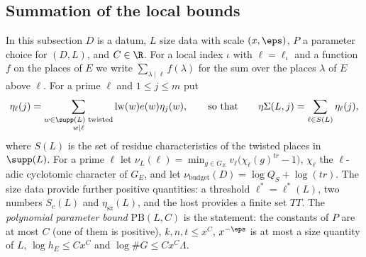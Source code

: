 \subsection{Summation of the local bounds}\label{sec:pf:linkN:sum}

In this subsection $D$ is a datum, $L$ size data with scale $(x,\eps)$, $P$ a parameter choice for $(D,L)$, and $C\in\R$.
For a local index $\iota$ with $\ell=\ell_\iota$ and a function $f$ on the places of $E$ we write $\sum_{\lambda\mid\ell}f(\lambda)$
for the sum over the places $\lambda$ of $E$ above $\ell$. For a prime $\ell$ and $1\le j\le m$ put
\[
\eta_\ell(j)=\sum_{\substack{w\in\supp(L)\text{ twisted}\\ w\mid\ell}}\linkNlw(w)e(w)\eta_j(w),\qquad\text{so that}\qquad
\linkNeS(L,j)=\sum_{\ell\in S(L)}\eta_\ell(j),
\]
where $S(L)$ is the set of residue characteristics of the twisted places in $\supp(L)$. For a prime $\ell$ let
$\nu_L(\ell)=\min_{g\in G_E}v_\ell\bigl(\chi_\ell(g)^{tr}-1\bigr)$, $\chi_\ell$ the $\ell$-adic cyclotomic character of $G_E$,
and let $\nu_{\mathrm{budget}}(D)=\log Q_S+\log(tr)$. The size data provide further positive quantities: a threshold
$\ell^*=\ell^*(L)$, two numbers $S_c(L)$ and $\eta_{\mathrm{sz}}(L)$, and the host provides a finite set $TT$. The
\emph{polynomial parameter bound} $\mathrm{PB}(L,C)$ is the statement: the constants of $P$ are at most $C$ (one of them is
positive), $k,n,t\le x^C$, $x^{-\eps}$ is at most a size quantity of $L$, $\log h_E\le Cx^C$ and $\log\#G\le Cx^C\Lambda$.


